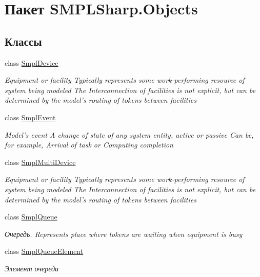 \hypertarget{namespace_s_m_p_l_sharp_1_1_objects}{\section{Пакет S\-M\-P\-L\-Sharp.\-Objects}
\label{d9/d75/namespace_s_m_p_l_sharp_1_1_objects}
}
\subsection*{Классы}
\begin{DoxyCompactItemize}
\item 
class \hyperlink{class_s_m_p_l_sharp_1_1_objects_1_1_smpl_device}{Smpl\-Device}
\begin{DoxyCompactList}\small\item\em Equipment or facility Typically represents some work-\/performing resource of system being modeled The Interconnection of facilities is not explicit, but can be determined by the model’s routing of tokens between facilities \end{DoxyCompactList}\item 
class \hyperlink{class_s_m_p_l_sharp_1_1_objects_1_1_smpl_event}{Smpl\-Event}
\begin{DoxyCompactList}\small\item\em Model's event A change of state of any system entity, active or passive Can be, for example, Arrival of task or Computing completion \end{DoxyCompactList}\item 
class \hyperlink{class_s_m_p_l_sharp_1_1_objects_1_1_smpl_multi_device}{Smpl\-Multi\-Device}
\begin{DoxyCompactList}\small\item\em Equipment or facility Typically represents some work-\/performing resource of system being modeled The Interconnection of facilities is not explicit, but can be determined by the model’s routing of tokens between facilities \end{DoxyCompactList}\item 
class \hyperlink{class_s_m_p_l_sharp_1_1_objects_1_1_smpl_queue}{Smpl\-Queue}
\begin{DoxyCompactList}\small\item\em Очередь. Represents place where tokens are waiting when equipment is busy \end{DoxyCompactList}\item 
class \hyperlink{class_s_m_p_l_sharp_1_1_objects_1_1_smpl_queue_element}{Smpl\-Queue\-Element}
\begin{DoxyCompactList}\small\item\em Элемент очереди \end{DoxyCompactList}\end{DoxyCompactItemize}
